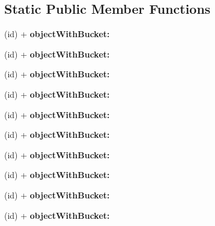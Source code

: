 \subsection*{\-Static \-Public \-Member \-Functions}
\begin{DoxyCompactItemize}
\item 
\hypertarget{interface_a_s_i_s3_bucket_object_a5907cfaf80350efb40b1821765a6e89a}{
(id) + {\bfseries object\-With\-Bucket\-:}}
\label{interface_a_s_i_s3_bucket_object_a5907cfaf80350efb40b1821765a6e89a}

\item 
\hypertarget{interface_a_s_i_s3_bucket_object_a5907cfaf80350efb40b1821765a6e89a}{
(id) + {\bfseries object\-With\-Bucket\-:}}
\label{interface_a_s_i_s3_bucket_object_a5907cfaf80350efb40b1821765a6e89a}

\item 
\hypertarget{interface_a_s_i_s3_bucket_object_a5907cfaf80350efb40b1821765a6e89a}{
(id) + {\bfseries object\-With\-Bucket\-:}}
\label{interface_a_s_i_s3_bucket_object_a5907cfaf80350efb40b1821765a6e89a}

\item 
\hypertarget{interface_a_s_i_s3_bucket_object_a5907cfaf80350efb40b1821765a6e89a}{
(id) + {\bfseries object\-With\-Bucket\-:}}
\label{interface_a_s_i_s3_bucket_object_a5907cfaf80350efb40b1821765a6e89a}

\item 
\hypertarget{interface_a_s_i_s3_bucket_object_a5907cfaf80350efb40b1821765a6e89a}{
(id) + {\bfseries object\-With\-Bucket\-:}}
\label{interface_a_s_i_s3_bucket_object_a5907cfaf80350efb40b1821765a6e89a}

\item 
\hypertarget{interface_a_s_i_s3_bucket_object_a5907cfaf80350efb40b1821765a6e89a}{
(id) + {\bfseries object\-With\-Bucket\-:}}
\label{interface_a_s_i_s3_bucket_object_a5907cfaf80350efb40b1821765a6e89a}

\item 
\hypertarget{interface_a_s_i_s3_bucket_object_a5907cfaf80350efb40b1821765a6e89a}{
(id) + {\bfseries object\-With\-Bucket\-:}}
\label{interface_a_s_i_s3_bucket_object_a5907cfaf80350efb40b1821765a6e89a}

\item 
\hypertarget{interface_a_s_i_s3_bucket_object_a5907cfaf80350efb40b1821765a6e89a}{
(id) + {\bfseries object\-With\-Bucket\-:}}
\label{interface_a_s_i_s3_bucket_object_a5907cfaf80350efb40b1821765a6e89a}

\item 
\hypertarget{interface_a_s_i_s3_bucket_object_a5907cfaf80350efb40b1821765a6e89a}{
(id) + {\bfseries object\-With\-Bucket\-:}}
\label{interface_a_s_i_s3_bucket_object_a5907cfaf80350efb40b1821765a6e89a}

\item 
\hypertarget{interface_a_s_i_s3_bucket_object_a5907cfaf80350efb40b1821765a6e89a}{
(id) + {\bfseries object\-With\-Bucket\-:}}
\label{interface_a_s_i_s3_bucket_object_a5907cfaf80350efb40b1821765a6e89a}

\end{DoxyCompactItemize}
